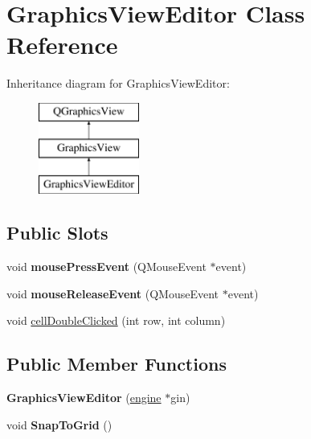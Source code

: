 \hypertarget{class_graphics_view_editor}{\section{Graphics\-View\-Editor Class Reference}
\label{class_graphics_view_editor}
}
Inheritance diagram for Graphics\-View\-Editor\-:\begin{figure}[H]
\begin{center}
\leavevmode
\includegraphics[height=3.000000cm]{class_graphics_view_editor}
\end{center}
\end{figure}
\subsection*{Public Slots}
\begin{DoxyCompactItemize}
\item 
\hypertarget{class_graphics_view_editor_a6709bc9e3a7f23511cfa0c4db6d92b5a}{void {\bfseries mouse\-Press\-Event} (Q\-Mouse\-Event $\ast$event)}\label{class_graphics_view_editor_a6709bc9e3a7f23511cfa0c4db6d92b5a}

\item 
\hypertarget{class_graphics_view_editor_aeba5b3d56d1e31abe9131476ddd7d20e}{void {\bfseries mouse\-Release\-Event} (Q\-Mouse\-Event $\ast$event)}\label{class_graphics_view_editor_aeba5b3d56d1e31abe9131476ddd7d20e}

\item 
void \hyperlink{class_graphics_view_editor_a662d6bdadf85a5726a895218d08fdb78}{cell\-Double\-Clicked} (int row, int column)
\end{DoxyCompactItemize}
\subsection*{Public Member Functions}
\begin{DoxyCompactItemize}
\item 
\hypertarget{class_graphics_view_editor_a23421b24ada3080db4b460bf00ac9965}{{\bfseries Graphics\-View\-Editor} (\hyperlink{classengine}{engine} $\ast$gin)}\label{class_graphics_view_editor_a23421b24ada3080db4b460bf00ac9965}

\item 
\hypertarget{class_graphics_view_editor_a5a50c83ccce7cf211e36507beab4d68a}{void {\bfseries Snap\-To\-Grid} ()}\label{class_graphics_view_editor_a5a50c83ccce7cf211e36507beab4d68a}

\end{DoxyCompactItemize}
